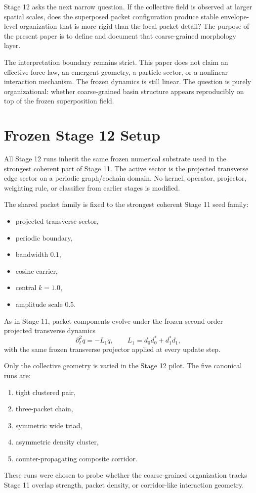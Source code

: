 \documentclass[11pt]{article}
\begin{document}
Stage 12 asks the next narrow question. If the collective field is observed at larger spatial scales, does the superposed packet configuration produce stable envelope-level organization that is more rigid than the local packet detail? The purpose of the present paper is to define and document that coarse-grained morphology layer.

The interpretation boundary remains strict. This paper does not claim an effective force law, an emergent geometry, a particle sector, or a nonlinear interaction mechanism. The frozen dynamics is still linear. The question is purely organizational: whether coarse-grained basin structure appears reproducibly on top of the frozen superposition field.

\section{Frozen Stage 12 Setup}
All Stage 12 runs inherit the same frozen numerical substrate used in the strongest coherent part of Stage 11. The active sector is the projected transverse edge sector on a periodic graph/cochain domain. No kernel, operator, projector, weighting rule, or classifier from earlier stages is modified.

The shared packet family is fixed to the strongest coherent Stage 11 seed family:
\begin{itemize}
\item projected transverse sector,
\item periodic boundary,
\item bandwidth $0.1$,
\item cosine carrier,
\item central $k = 1.0$,
\item amplitude scale $0.5$.
\end{itemize}
As in Stage 11, packet components evolve under the frozen second-order projected transverse dynamics
\begin{equation}
\partial_t^2 q = -L_1 q,
\qquad
L_1 = d_0 d_0^{*} + d_1^{*} d_1,
\end{equation}
with the same frozen transverse projector applied at every update step.

Only the collective geometry is varied in the Stage 12 pilot. The five canonical runs are:
\begin{enumerate}
\item tight clustered pair,
\item three-packet chain,
\item symmetric wide triad,
\item asymmetric density cluster,
\item counter-propagating composite corridor.
\end{enumerate}
These runs were chosen to probe whether the coarse-grained organization tracks Stage 11 overlap strength, packet density, or corridor-like interaction geometry.
\end{document}
